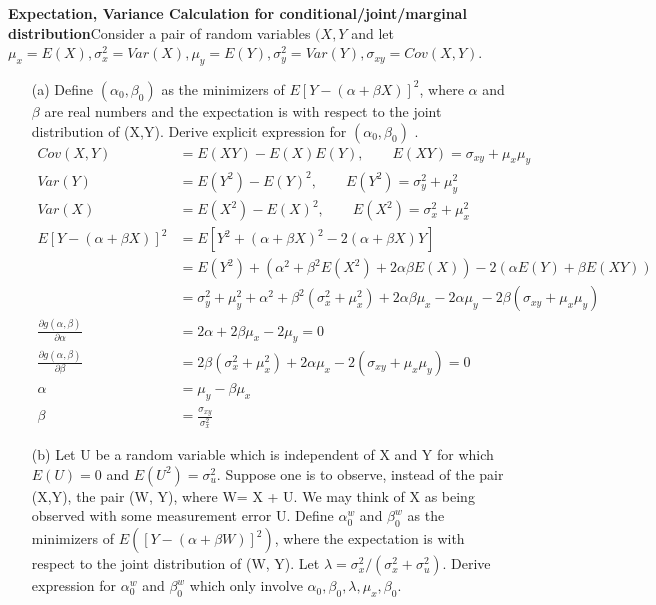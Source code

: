 \documentclass{homework}
\begin{document}
\exercise
\textbf{Expectation, Variance Calculation for conditional/joint/marginal distribution}Consider a pair of random variables $(X, Y$ and let $\mu_x = E(X), \sigma_x^2= Var(X), \mu_y = E(Y), \sigma_y^2 = Var(Y), \sigma_{xy} = Cov(X,Y)$.
\begin{itemize}
    \item [(a)] Define $(\alpha_0, \beta_0)$ as the minimizers of $E[Y-(\alpha + \beta X)]^2$, where $\alpha$ and $\beta$ are real numbers and the expectation is with respect to the joint distribution of (X,Y). Derive explicit expression for $(\alpha_0, \beta_0)$ .
    \begin{align*}
    Cov(X,Y) &= E(XY) - E(X)E(Y), \qquad E(XY) = \sigma_{xy} + \mu_x\mu_y\\
    Var(Y) &= E(Y^2) - E(Y)^2, \qquad E(Y^2) = \sigma_y^2 + \mu_y^2\\
    Var(X) &= E(X^2) - E(X)^2, \qquad E(X^2) = \sigma_x^2 + \mu_x^2\\
     E[Y-(\alpha + \beta X)]^2 &= E[Y^2 + (\alpha + \beta X)^2 -2(\alpha + \beta X)Y ]\\
     &= E(Y^2) + (\alpha^2 + \beta^2 E(X^2) + 2\alpha\beta E(X)) - 2(\alpha E(Y) + \beta E(XY))\\
     &= \sigma_y^2+\mu_y^2 + \alpha^2 + \beta^2 (\sigma_x^2 + \mu_x^2) + 2\alpha\beta \mu_x -2\alpha \mu_y -2 \beta (\sigma_{xy}+ \mu_x\mu_y)\\
     \frac{\partial g(\alpha,\beta)}{\partial \alpha} &= 2\alpha + 2\beta \mu_x - 2\mu_y = 0\\
     \frac{\partial g(\alpha,\beta)}{\partial \beta} &=2\beta (\sigma_x^2 + \mu_x^2) + 2\alpha \mu_x -2(\sigma_{xy}+\mu_x\mu_y) = 0\\
     \alpha &= \mu_y - \beta \mu_x\\
     \beta &= \frac{\sigma_{xy}}{\sigma_x^2}
    \end{align*}    
    \item[(b)] Let U be a random variable which is independent of X and Y for which $E(U) = 0$ and $E(U^2) = \sigma_u^2$. Suppose one is to observe, instead of the pair (X,Y), the pair (W, Y), where W= X + U. We may think of X as being observed with some measurement error U. Define $\alpha_0^w$ and $\beta_0^w$ as the minimizers of $E([Y- (\alpha + \beta W)]^2)$, where the expectation is with respect to the joint distribution of (W, Y). Let $\lambda = \sigma_x^2/(\sigma_x^2 + \sigma_u^2)$. Derive expression for $\alpha_0^w$ and $\beta_0^w$ which only involve $\alpha_0, \beta_0, \lambda, \mu_x, \beta_0$.
    \begin{align*}

\end{align*}
\end{itemize}
\end{document}
